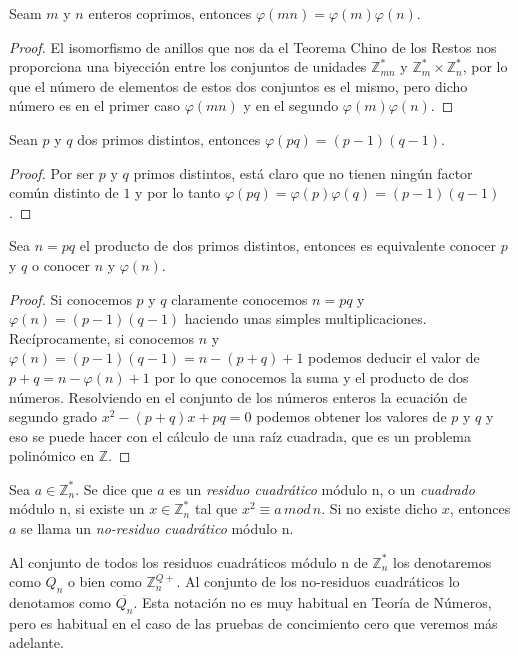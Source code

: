 \begin{corollary}
Seam $m$ y $n$ enteros coprimos, entonces $\varphi(mn)=\varphi(m)\varphi(n)$.
\end{corollary}
\begin{proof}
El isomorfismo de anillos que nos da el Teorema Chino de los Restos nos proporciona una
biyecci\'on entre los conjuntos de unidades ${\mathbb Z}_{mn}^*$ y ${\mathbb Z}_m^* \times
{\mathbb Z}_n^*$, por lo que el n\'umero de elementos de estos dos conjuntos es
el mismo, pero dicho n\'umero es en el primer caso $\varphi(mn)$ y en el segundo $\varphi(m)\varphi(n)$.
\end{proof}

\begin{corollary}
Sean $p$ y $q$ dos primos distintos, entonces $\varphi(pq) = (p-1)(q-1)$.
\end{corollary}
\begin{proof}
Por ser $p$ y $q$ primos distintos, est\'a claro que no tienen ning\'un factor
com\'un distinto de $1$ y por lo tanto $\varphi(pq) = \varphi(p)\varphi(q) =
(p-1)(q-1)$.
\end{proof}

\begin{remark}
Sea $n = pq$ el producto de dos primos distintos, entonces es
equivalente conocer $p$ y $q$ o conocer $n$ y $\varphi(n)$.
\end{remark}
\begin{proof}
Si conocemos $p$ y $q$ claramente conocemos $n = pq$ y $\varphi(n) = (p-1)(q-1)$
haciendo unas simples multiplicaciones.
Rec\'iprocamente, si conocemos $n$ y $\varphi(n) = (p-1)(q-1) = n - (p+q) + 1$
podemos deducir el valor de $p+q = n -\varphi(n) + 1$ por lo que conocemos la suma y el
producto de dos n\'umeros. Resolviendo en el conjunto de los n\'umeros enteros
la ecuaci\'on de segundo grado $x^2 -(p+q)x + pq = 0$ podemos obtener los valores
de $p$ y $q$ y eso se puede hacer con el c\'alculo de una ra\'iz cuadrada, que
es un problema polin\'omico en ${\mathbb Z}$.
\end{proof}

\begin{definition}
	Sea $a\in \mathbb{Z}^*_n$. Se dice que $a$ es un \textit{residuo cuadrático}
	módulo n, o un \textit{cuadrado} módulo n, si existe un $x \in \mathbb{Z}^*_n$
	tal que $x^2 \equiv a \, mod \, n$.
	Si no existe dicho $x$, entonces $a$ se llama un \textit{no-residuo cuadrático} módulo n.

	Al conjunto de todos los residuos cuadráticos módulo n de $\mathbb{Z}^*_n$ los
	denotaremos como $Q_n$ o bien como $\mathbb{Z}^{Q+}_n$.
	Al conjunto de los no-residuos cuadráticos lo denotamos como $\overline{Q_n}$.
	Esta notaci\'on no es muy habitual en Teor\'ia de N\'umeros, pero es habitual en el caso de las
	pruebas de concimiento cero que veremos m\'as adelante.
\end{definition}

